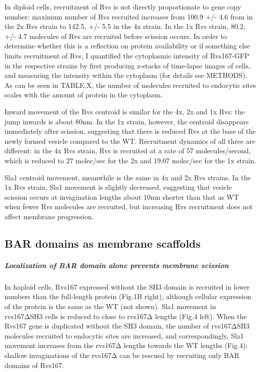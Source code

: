 	
	\vspace{5mm}
	In diploid cells, recruitment of Rvs is not directly proportionate to gene copy number: maximum number of Rvs recruited increases from 100.9 +/- 4.6 from in the 2x Rvs strain to 142.5, +/- 5.5 in the 4x strain. In the 1x Rvs strain, 80.2, +/- 4.7 molecules of Rvs are recruited before scission occurs. In order to determine whether this is a reflection on protein availability or if something else limits recruitment of Rvs, I quantified the cytoplasmic intensity of Rvs167-GFP in the respective strains by first producing z-stacks of time-lapse images of cells, and measuring the intensity within the cytoplasm (for details see METHODS). As can be seen in TABLE.X, the number of molecules recruited to endocytic sites scales with the amount of protein in the cytoplasm.  
	\vspace{5mm}
	
	Inward movement of the Rvs centroid is similar for the 4x, 2x and 1x Rvs: the jump inwards is about 80nm. In the 1x strain, however, the centroid disappears immediately after scission, suggesting that there is reduced Rvs at the base of the newly formed vesicle compared to the WT. Recruitment dynamics of all three are different: in the 4x Rvs strain, Rvs is recruited at a rate of 57 molecules/second, which is reduced to 27 molec/sec for the 2x and 19.07 molec/sec for the 1x strain. 

	\vspace{5mm}
	 Sla1 centroid movement, meanwhile is the same in 4x and 2x Rvs strains. In the 1x Rvs strain, Sla1 movement is slightly decreased, suggesting that vesicle scission occurs at invagination lengths about 10nm shorter than that as WT when fewer Rvs molecules are recruited, but increasing Rvs recruitment does not affect membrane progression. 




	
	\subsection{BAR domains as membrane scaffolds}
		\subparagraph{Localization of BAR domain alone prevents membrane scission}
		 In haploid cells, Rvs167 expressed without the SH3 domain is recruited in lower numbers than the full-length protein (Fig.1B right), although cellular expression of the protein is the same as the WT (not shown). Sla1 movement in rvs167ΔSH3 cells is reduced to close to rvs167Δ lengths (Fig.4 left). When the Rvs167 gene is duplicated without the SH3 domain, the number of rvs167ΔSH3 molecules recruited to endocytic sites are increased, and correspondingly, Sla1 movement increases from the rvs167Δ lengths towards the WT lengths (Fig.4): shallow invaginations of the rvs167Δ can be rescued by recruiting only BAR domains of Rvs167.
		 
